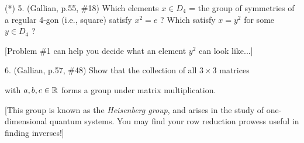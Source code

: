 \documentclass[12pt]{article}
\begin{document}
\begin{description}
\msk

\item{(*) 5.} (Gallian, p.55, \#18) Which elements $x\in D_4$ = the group
of symmetries of a regular 4-gon (i.e., square) satisfy $x^2=e$ ?
Which satisfy $x=y^2$ for some $y\in D_4$ ? 

\item{\spc} [Problem \#1 can help you decide what an element $y^2$
can look like...]

\msk

\item{6.} (Gallian, p.57, \#48) Show that the collection of all $3\times 3$
matrices 

\ssk


\ssk

\item{\spc} with $a,b,c\in {\mathbb R}$ forms a group under matrix multiplication.

\ssk

\item{\spc} [This group is known as the {\it Heisenberg group}, and arises in the study of
one-dimensional quantum systems. You may find your row reduction prowess useful
in finding inverses!]

\msk


\end{description}
\vfill
\end{document}

